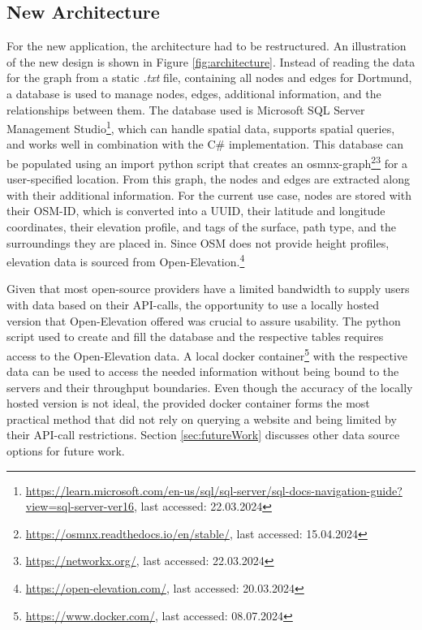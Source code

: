 \subsection{New Architecture}
\label{sec:newArchitecture}

For the new application, the architecture had to be restructured.
An illustration of the new design is shown in Figure \ref{fig:architecture}.
Instead of reading the data for the graph from a static \textit{.txt} file, containing all nodes and edges for Dortmund, a database is used to manage nodes, edges, additional information, and the relationships between them. 
The database used is Microsoft SQL Server Management Studio\footnote{\url{https://learn.microsoft.com/en-us/sql/sql-server/sql-docs-navigation-guide?view=sql-server-ver16}, last accessed: 22.03.2024}, which can handle spatial data, supports spatial queries, and works well in combination with the C\# implementation.
This database can be populated using an import python script that creates an osmnx-graph\footnote{\url{https://osmnx.readthedocs.io/en/stable/}, last accessed: 15.04.2024}\footnote{\url{https://networkx.org/}, last accessed: 22.03.2024} for a user-specified location. 
From this graph, the nodes and edges are extracted along with their additional information.
For the current use case, nodes are stored with their OSM-ID, which is converted into a UUID, their latitude and longitude coordinates, their elevation profile, and tags of the surface, path type, and the surroundings they are placed in.
Since OSM does not provide height profiles, elevation data is sourced from Open-Elevation.\footnote{\url{https://open-elevation.com/}, last accessed: 20.03.2024} 

Given that most open-source providers have a limited bandwidth to supply users with data based on their API-calls, the opportunity to use a locally hosted version that Open-Elevation offered was crucial to assure usability.
The python script used to create and fill the database and the respective tables requires access to the Open-Elevation data.
A local docker container\footnote{\url{https://www.docker.com/}, last accessed: 08.07.2024} with the respective data can be used to access the needed information without being bound to the servers and their throughput boundaries. 
Even though the accuracy of the locally hosted version is not ideal, the provided docker container forms the most practical method that did not rely on querying a website and being limited by their API-call restrictions.
Section \ref{sec:futureWork} discusses other data source options for future work.



